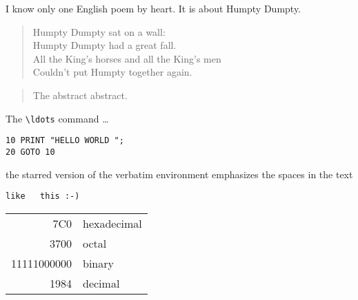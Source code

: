 \documentclass[a4paper, 11pt]{article}
\begin{document}
I know only one English poem by heart. It is about Humpty Dumpty.
\begin{flushleft}
  \begin{verse}
    Humpty Dumpty sat on a wall:\\
    Humpty Dumpty had a great fall.\\
    All the King's horses and all the King's men\\
    Couldn't put Humpty together again.
  \end{verse}
\end{flushleft}


\begin{abstract}
  The abstract abstract.
\end{abstract}





The \verb|\ldots| command \ldots

\begin{verbatim}
10 PRINT "HELLO WORLD ";
20 GOTO 10
\end{verbatim}

\begin{verbatim*}
the starred version of the       verbatim
environment emphasizes the spaces    in the text
\end{verbatim*}

\verb*|like   this :-) |




\begin{tabular}{|r|l|}
\hline
  7C0 & hexadecimal \\
  3700 & octal \\ 

  \cline{2-2}
  11111000000 & binary \\

\hline 
\hline
  1984 & decimal \\
\hline
\end{tabular}
\end{document}
